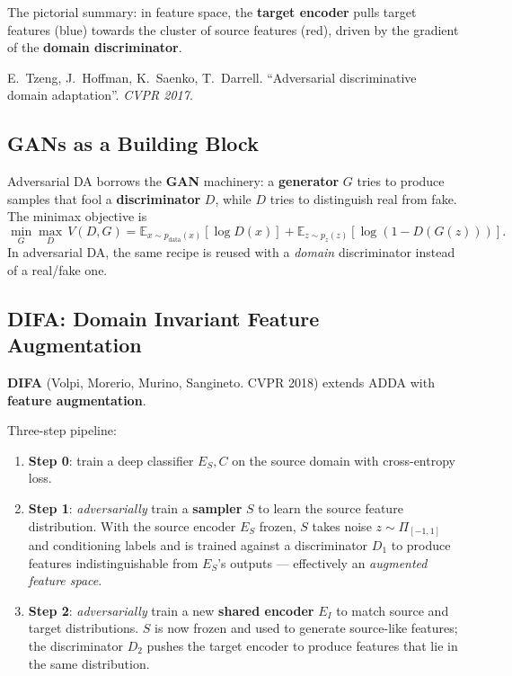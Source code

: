 \documentclass[11pt,a4paper]{article}
\theoremstyle{definition}
\theoremstyle{plain}
\theoremstyle{remark}
\begin{document}
The pictorial summary: in feature space, the \textbf{target encoder} pulls target features (blue) towards the cluster of source features (red), driven by the gradient of the \textbf{domain discriminator}.

\begin{tcolorbox}[colback=blue!5!white,colframe=blue!60!black,title={Reference}]
E.\ Tzeng, J.\ Hoffman, K.\ Saenko, T.\ Darrell. ``Adversarial discriminative domain adaptation''. \textit{CVPR 2017}.
\end{tcolorbox}

\subsection{GANs as a Building Block}

Adversarial DA borrows the \textbf{GAN} machinery: a \textbf{generator} $G$ tries to produce samples that fool a \textbf{discriminator} $D$, while $D$ tries to distinguish real from fake. The minimax objective is
\begin{equation}
    \min_G \max_D \, V(D,G) = \mathbb{E}_{x\sim p_{\text{data}}(x)}[\log D(x)] + \mathbb{E}_{z\sim p_z(z)}[\log(1 - D(G(z)))].
\end{equation}
In adversarial DA, the same recipe is reused with a \emph{domain} discriminator instead of a real/fake one.

\subsection{DIFA: Domain Invariant Feature Augmentation}

\textbf{DIFA} (Volpi, Morerio, Murino, Sangineto. CVPR 2018) extends ADDA with \textbf{feature augmentation}.

Three-step pipeline:
\begin{enumerate}
    \item \textbf{Step 0}: train a deep classifier $E_S, C$ on the source domain with cross-entropy loss.
    \item \textbf{Step 1}: \emph{adversarially} train a \textbf{sampler} $S$ to learn the source feature distribution. With the source encoder $E_S$ frozen, $S$ takes noise $z \sim \Pi_{[-1,1]}$ and conditioning labels and is trained against a discriminator $D_1$ to produce features indistinguishable from $E_S$'s outputs --- effectively an \emph{augmented feature space}.
    \item \textbf{Step 2}: \emph{adversarially} train a new \textbf{shared encoder} $E_I$ to match source and target distributions. $S$ is now frozen and used to generate source-like features; the discriminator $D_2$ pushes the target encoder to produce features that lie in the same distribution.
\end{enumerate}
\end{document}
